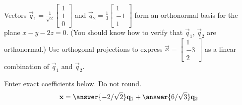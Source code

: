 \documentclass{ximera}
\author{}
\begin{document}
\begin{exercise}
Vectors $\vec{q}_1=\frac{1}{\sqrt{2}}\begin{bmatrix}1\\1\\0\end{bmatrix}$ and $\vec{q}_2=\frac{1}{3}\begin{bmatrix}1\\-1\\1\end{bmatrix}$ form an orthonormal basis for the plane $x-y-2z=0$.  (You should know how to verify that $\vec{q}_1$, $\vec{q}_2$ are orthonormal.)  Use orthogonal projections to express $\vec{x}=\begin{bmatrix}1\\-3\\2\end{bmatrix}$ as a linear combination of $\vec{q}_1$ and $\vec{q}_2$.

Enter exact coefficients below.  Do not round.
$$\vec{x}=\answer{-2/\sqrt{2}}\vec{q}_1+\answer{6/\sqrt{3}}\vec{q}_2$$
 \end{exercise}
 
\end{document}
